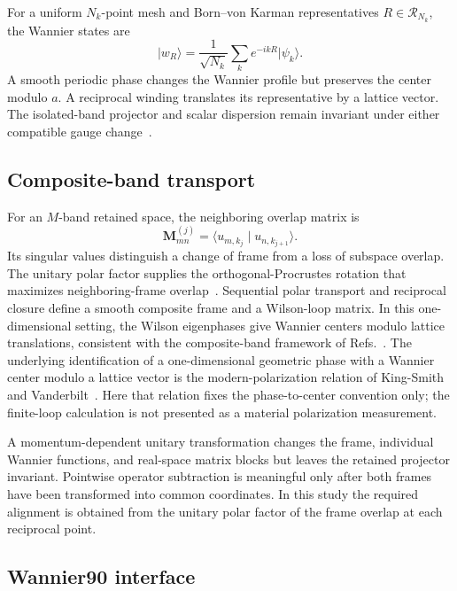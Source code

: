 For a uniform $N_k$-point mesh and Born--von Karman representatives
$R\in\mathcal R_{N_k}$, the Wannier states are
\begin{equation}
    \lvert w_R\rangle
    =
    \frac{1}{\sqrt{N_k}}
    \sum_k e^{-ikR}\lvert\psi_k\rangle.
    \label{eq:periodic-1d-wannier-transform}
\end{equation}
A smooth periodic phase changes the Wannier profile but preserves the center
modulo $a$. A reciprocal winding translates its representative by a lattice
vector. The isolated-band projector and scalar dispersion remain invariant
under either compatible gauge change~\cite{kohn1959,marzari2012}.

\subsection{Composite-band transport}

For an $M$-band retained space, the neighboring overlap matrix is
\begin{equation}
    \mathbf M^{(j)}_{mn}
    =\langle u_{m,k_j}\mid u_{n,k_{j+1}}\rangle.
    \label{eq:periodic-1d-neighbor-overlap}
\end{equation}
Its singular values distinguish a change of frame from a loss of subspace
overlap. The unitary polar factor supplies the orthogonal-Procrustes rotation
that maximizes neighboring-frame overlap~\cite{schonemann1966,higham1986}. Sequential
polar transport and reciprocal closure define a smooth composite frame and a
Wilson-loop matrix. In this one-dimensional setting, the Wilson eigenphases
give Wannier centers modulo lattice translations, consistent with the
composite-band framework of
Refs.~\cite{marzari1997,souza2001}. The underlying identification of a
one-dimensional geometric phase with a Wannier center modulo a lattice vector
is the modern-polarization relation of King-Smith and
Vanderbilt~\cite{kingsmith1993}. Here that relation fixes the phase-to-center
convention only; the finite-loop calculation is not presented as a material
polarization measurement.

A momentum-dependent unitary transformation changes the frame, individual
Wannier functions, and real-space matrix blocks but leaves the retained
projector invariant. Pointwise operator subtraction is meaningful only after
both frames have been transformed into common coordinates. In this study the
required alignment is obtained from the unitary polar factor of the frame
overlap at each reciprocal point.

\subsection{Wannier90 interface}


